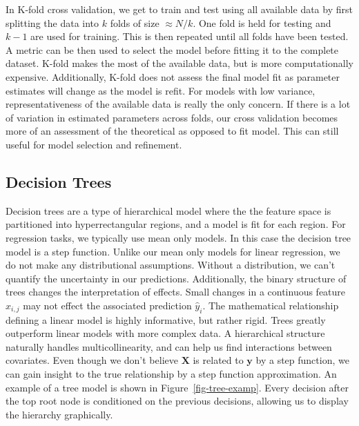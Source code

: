 \documentclass[
  12pt,
  letterpaper,
  DIV=11,
  numbers=noendperiod]{scrartcl}
\newcommand{\bm}{\mathbf}
\begin{document}
In K-fold cross validation, we get to train and test using all available
data by first splitting the data into \(k\) folds of size
\(\approx N/k\). One fold is held for testing and \(k-1\) are used for
training. This is then repeated until all folds have been tested. A
metric can be then used to select the model before fitting it to the
complete dataset. K-fold makes the most of the available data, but is
more computationally expensive. Additionally, K-fold does not assess the
final model fit as parameter estimates will change as the model is
refit. For models with low variance, representativeness of the available
data is really the only concern. If there is a lot of variation in
estimated parameters across folds, our cross validation becomes more of
an assessment of the theoretical as opposed to fit model. This can still
useful for model selection and refinement.

\subsection{Decision Trees}\label{decision-trees}

Decision trees are a type of hierarchical model where the the feature
space is partitioned into hyperrectangular regions, and a model is fit
for each region. For regression tasks, we typically use mean only
models. In this case the decision tree model is a step function. Unlike
our mean only models for linear regression, we do not make any
distributional assumptions. Without a distribution, we can't quantify
the uncertainty in our predictions. Additionally, the binary structure
of trees changes the interpretation of effects. Small changes in a
continuous feature \(x_{i,j}\) may not effect the associated prediction
\(\hat y_i\). The mathematical relationship defining a linear model is
highly informative, but rather rigid. Trees greatly outperform linear
models with more complex data. A hierarchical structure naturally
handles multicollinearity, and can help us find interactions between
covariates. Even though we don't believe \(\bm X\) is related to
\(\bm y\) by a step function, we can gain insight to the true
relationship by a step function approximation. An example of a tree
model is shown in Figure~\ref{fig-tree-examp}. Every decision after the
top root node is conditioned on the previous decisions, allowing us to
display the hierarchy graphically.
\end{document}
